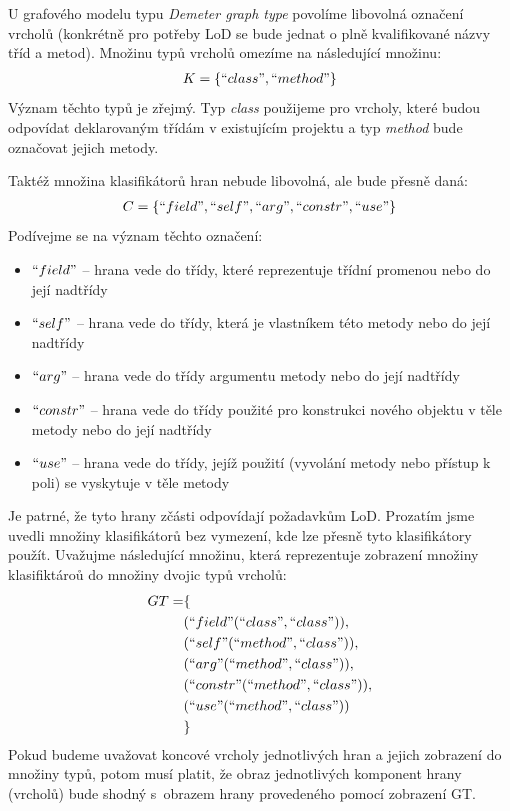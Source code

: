 U grafového modelu typu \emph{Demeter graph type} povolíme libovolná označení vrcholů (konkrétně pro potřeby LoD se bude jednat o plně kvalifikované názvy tříd a metod). Množinu typů vrcholů omezíme na následující množinu:
\begin{align*}
K = \{ ``class", ``method" \}
\end{align*}
Význam těchto typů je zřejmý. Typ \emph{class} použijeme pro vrcholy, které budou odpovídat deklarovaným třídám v existujícím projektu a typ \emph{method} bude označovat jejich metody.

Taktéž množina klasifikátorů hran nebude libovolná, ale bude přesně daná:
\begin{align*}
C = \{ ``field", ``self", ``arg", ``constr", ``use" \}
\end{align*}
Podívejme se na význam těchto označení:
\begin{itemize}
\item $``field"$ -- hrana vede do třídy, které reprezentuje třídní promenou nebo do její nadtřídy
\item $``self"$ -- hrana vede do třídy, která je vlastníkem této metody nebo do její nadtřídy
\item $``arg"$ -- hrana vede do třídy argumentu metody nebo do její nadtřídy
\item $``constr"$ -- hrana vede do třídy použité pro konstrukci nového objektu v těle metody nebo do její nadtřídy
\item $``use"$ -- hrana vede do třídy, jejíž použití (vyvolání metody nebo přístup k poli) se vyskytuje v těle metody
\end{itemize}
Je patrné, že tyto hrany zčásti odpovídají požadavkům LoD. Prozatím jsme uvedli množiny klasifikátorů bez vymezení, kde lze přesně tyto klasifikátory použít. Uvažujme následující množinu, která reprezentuje zobrazení množiny klasifiktároů do množiny dvojic typů vrcholů:
\begin{align*}
GT = &\{ \\
&(``field" (``class", ``class")), \\
&(``self" (``method", ``class")), \\
&(``arg" (``method", ``class")), \\
&(``constr" (``method", ``class")), \\
&(``use" (``method", ``class")) \\
&\}
\end{align*}
Pokud budeme uvažovat koncové vrcholy jednotlivých hran a jejich zobrazení do množiny typů, potom musí platit, že obraz jednotlivých komponent hrany (vrcholů) bude shodný s~obrazem hrany provedeného pomocí zobrazení GT.

